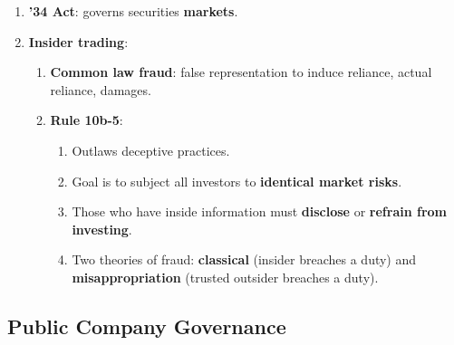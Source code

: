 \begin{enumerate}
\begin{enumerate}
\begin{enumerate}
        \end{enumerate}
    \end{enumerate}
    \item \textbf{'34 Act}: governs securities \textbf{markets}.
    \item \textbf{Insider trading}:
    \begin{enumerate}
        \item \textbf{Common law fraud}: false representation to induce 
        reliance, actual reliance, damages.
        \item \textbf{Rule 10b-5}:
        \begin{enumerate}
            \item Outlaws deceptive practices.
            \item Goal is to subject all investors to \textbf{identical market 
            risks}.
            \item Those who have inside information must \textbf{disclose} or 
            \textbf{refrain from investing}.
            \item Two theories of fraud: \textbf{classical} (insider breaches 
            a duty) and \textbf{misappropriation} (trusted outsider breaches a 
            duty).
        \end{enumerate} 
    \end{enumerate}
\end{enumerate}

\newpage

\subsection{Public Company Governance}

